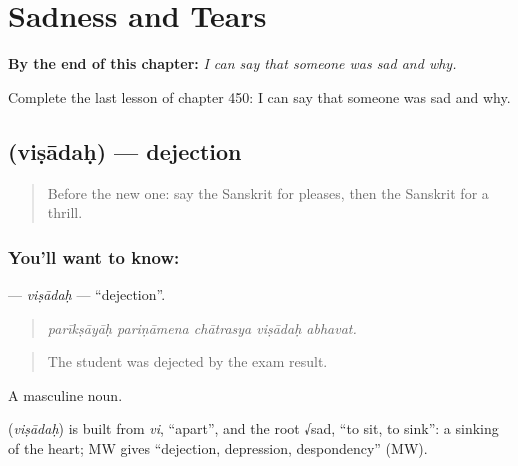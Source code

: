 
\chapter{Sadness and Tears}
\label{ch:sa-sadness-and-tears}

\begin{chapteropening}
\textbf{By the end of this chapter:} \emph{I can say that someone was sad and why.}

Complete the last lesson of chapter 450: I can say that someone was sad and why.
\end{chapteropening}

\section[\texorpdfstring{\sk{विषादः} (viṣādaḥ)}{विषादः (viṣādaḥ)}]{ (viṣādaḥ) — dejection}

\label{lesson:SA-C450-visadah}



\begin{quote}
Before the new one: say the Sanskrit for pleases, then the Sanskrit for a thrill.
\end{quote}

\subsection*{You'll want to know: }
\textbf{} — \emph{viṣādaḥ} — \textquotedblleft{}dejection\textquotedblright{}.

\begin{quote}
    
\end{quote}

\begin{quote}
\emph{parīkṣāyāḥ pariṇāmena chātrasya viṣādaḥ abhavat.}
\end{quote}

\begin{quote}
The student was dejected by the exam result.
\end{quote}

A masculine noun.

\begin{cousinweb}
\textbf{} (\emph{viṣādaḥ}) is built from \emph{vi}, \textquotedblleft{}apart\textquotedblright{}, and the root √sad, \textquotedblleft{}to sit, to sink\textquotedblright{}: a sinking of the heart; MW gives \textquotedblleft{}dejection, depression, despondency\textquotedblright{} (MW).
\end{cousinweb}

